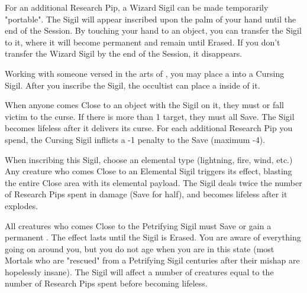 For an additional Research Pip, a Wizard Sigil can be made temporarily "portable". The Sigil will appear inscribed upon the palm of your hand until the end of the Session. By touching your hand to an object, you can transfer the Sigil to it, where it will become permanent and remain until Erased. If you don't transfer the Wizard Sigil by the end of the Session, it disappears.






Working with someone versed in the arts of , you may place a  into a Cursing Sigil. After you inscribe the Sigil, the occultist can place a  inside of it. 

When anyone comes Close to an object with the Sigil on it, they must  or fall victim to the curse. If there is more than 1 target, they must all Save.  The Sigil becomes lifeless after it delivers its curse.  For each additional Research Pip you spend, the Cursing Sigil inflicts a -1 penalty to the Save (maximum -4).



When inscribing this Sigil, choose an elemental type (lightning, fire, wind, etc.) Any creature who comes Close to an Elemental Sigil triggers its effect, blasting the entire Close area with its elemental payload. The Sigil deals twice the number of Research Pips spent in damage (Save for half), and becomes lifeless after it explodes.


All creatures who comes Close to the Petrifying Sigil must Save or gain a permanent . The effect lasts until the Sigil is Erased. You are aware of everything going on around you, but you do not age when you are in this state (most Mortals who are "rescued" from a Petrifying Sigil centuries after their mishap are hopelessly insane). The Sigil will affect a number of creatures equal to the number of Research Pips spent before becoming lifeless.


